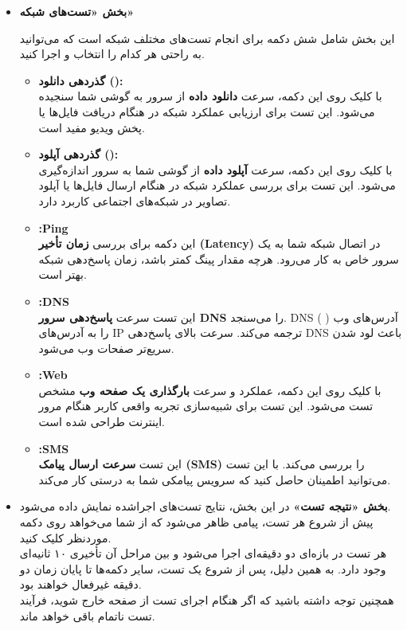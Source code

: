 \documentclass{report}
\begin{document}
\begin{itemize}
	\item \textbf{بخش «تست‌های شبکه»} 

این بخش شامل شش دکمه برای انجام تست‌های مختلف شبکه است که می‌توانید به راحتی هر کدام را انتخاب و اجرا کنید.

\begin{itemize}
	\item \textbf{گذردهی دانلود ():}\\
	با کلیک روی این دکمه، سرعت \textbf{دانلود داده} از سرور به گوشی شما سنجیده می‌شود. این تست برای ارزیابی عملکرد شبکه در هنگام دریافت فایل‌ها یا پخش ویدیو مفید است.
	
	\item \textbf{گذردهی آپلود ():}\\
	با کلیک روی این دکمه، سرعت \textbf{آپلود داده} از گوشی شما به سرور اندازه‌گیری می‌شود. این تست برای بررسی عملکرد شبکه در هنگام ارسال فایل‌ها یا آپلود تصاویر در شبکه‌های اجتماعی کاربرد دارد.
	
	\item \textbf{:Ping}\\
	این دکمه برای بررسی \textbf{زمان تأخیر (Latency)} در اتصال شبکه شما به یک سرور خاص به کار می‌رود. هرچه مقدار پینگ کمتر باشد، زمان پاسخ‌دهی شبکه بهتر است.
	
	\item \textbf{:DNS}\\
	این تست سرعت \textbf{پاسخ‌دهی سرور DNS} را می‌سنجد. DNS آدرس‌های وب ( ) را به آدرس‌های IP ترجمه می‌کند. سرعت بالای پاسخ‌دهی DNS باعث لود شدن سریع‌تر صفحات وب می‌شود.
	
	\item \textbf{:Web}\\
	با کلیک روی این دکمه، عملکرد و سرعت \textbf{بارگذاری یک صفحه وب} مشخص تست می‌شود. این تست برای شبیه‌سازی تجربه واقعی کاربر هنگام مرور اینترنت طراحی شده است.
	
	\item \textbf{:SMS}\\
	این تست \textbf{سرعت ارسال پیامک (SMS)} را بررسی می‌کند. با این تست می‌توانید اطمینان حاصل کنید که سرویس پیامکی شما به درستی کار می‌کند.
\end{itemize}

\item \textbf{بخش «نتیجه تست»}  
در این بخش، نتایج تست‌های اجراشده نمایش داده می‌شود.\\
پیش از شروع هر تست، پیامی ظاهر می‌شود که از شما می‌خواهد روی دکمه موردنظر کلیک کنید.\\
هر تست در بازه‌ای دو دقیقه‌ای اجرا می‌شود و بین مراحل آن تأخیری ۱۰ ثانیه‌ای وجود دارد. 
به همین دلیل، پس از شروع یک تست، سایر دکمه‌ها تا پایان زمان دو دقیقه غیرفعال خواهند بود.\\

همچنین توجه داشته باشید که اگر هنگام اجرای تست از صفحه خارج شوید، فرآیند تست ناتمام باقی خواهد ماند.


\end{itemize}
\end{document}
